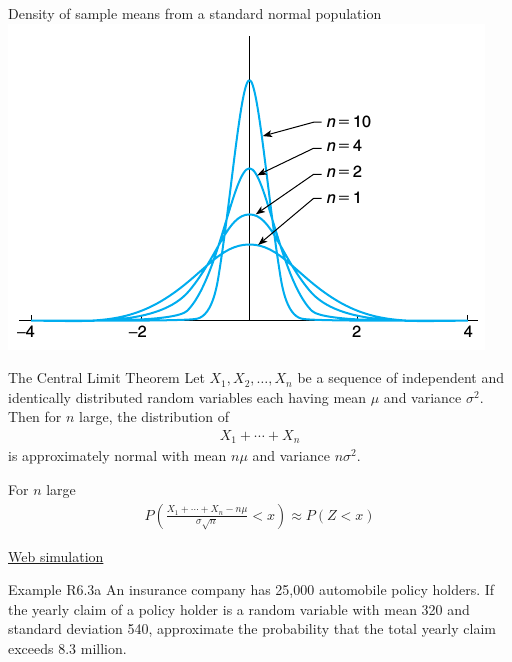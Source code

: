 \documentclass{beamer}
\renewcommand{\P}[1]{P\left(#1\right)}
\begin{document}
\begin{frame}{Density of sample means from a standard normal population}
  \includegraphics[width=\linewidth]{dpf-sample-mean}
\end{frame}

\begin{frame}{The Central Limit Theorem}
  Let $X_1,X_2,\ldots,X_n$ be a sequence of independent and identically
  distributed random variables each having mean $\mu$ and variance
  $\sigma^2$. Then for $n$ large, the distribution of
  \begin{align*}
    X_1 + \cdots + X_n
  \end{align*}
  is approximately normal with mean $n\mu$ and variance $n\sigma^2$.

  For $n$ large
  \begin{align*}
    \P{\frac{X_1+\cdots+X_n - n\mu}{\sigma\sqrt{n}}<x} \approx \P{Z<x}
  \end{align*}

  \begin{center}
    \href{http://students.brown.edu/seeing-theory/distributions/index.html\#third}{Web
      simulation}
  \end{center}
\end{frame}

\begin{frame}[t,shrink=10]{Example R6.3a}
  An insurance company has 25,000 automobile policy holders. If the yearly
  claim of a policy holder is a random variable with mean 320 and standard
  deviation 540, approximate the probability that the total yearly claim exceeds
  8.3 million.
\end{frame}
\end{document}
